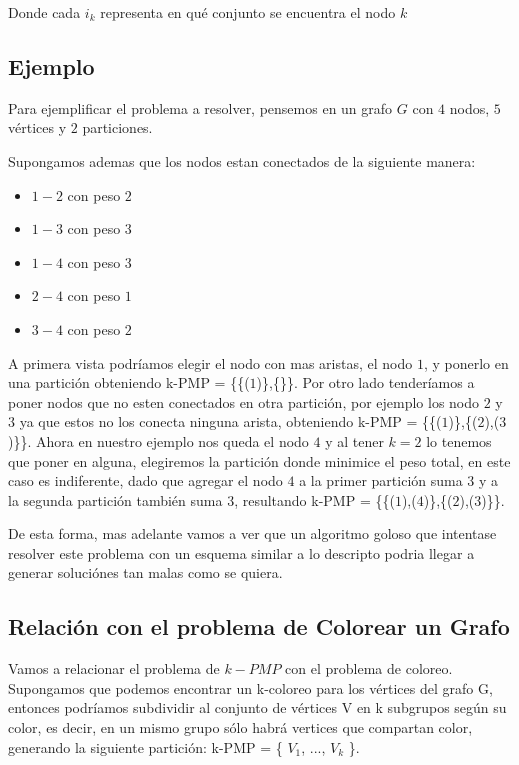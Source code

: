 Donde cada $i_k$ representa en qué conjunto se encuentra el nodo $k$

\subsection{Ejemplo}

Para ejemplificar el problema a resolver, pensemos en un grafo $G$ con $4$ nodos, $5$ vértices y $2$ particiones.

Supongamos ademas que los nodos estan conectados de la siguiente manera:

\begin{itemize}

	\item $1-2$ con peso $2$
	\item $1-3$ con peso $3$
	\item $1-4$ con peso $3$
	\item $2-4$ con peso $1$
	\item $3-4$ con peso $2$

\end{itemize}

A primera vista podríamos elegir el nodo con mas aristas, el nodo $1$, y ponerlo en una partición obteniendo k-PMP = \{\{($1$)\},\{\}\}. Por otro lado tenderíamos a poner nodos que no esten conectados en otra partición, por ejemplo los nodo $2$ y $3$ ya que estos no los conecta ninguna arista, obteniendo k-PMP = \{\{($1$)\},\{($2$),($3$)\}\}. Ahora en nuestro ejemplo nos queda el nodo $4$ y al tener $k = 2$ lo tenemos que poner en alguna, elegiremos la partición donde minimice el peso total, en este caso es indiferente, dado que agregar el nodo $4$ a la primer partición suma $3$ y a la segunda partición también suma $3$, resultando k-PMP = \{\{($1$),($4$)\},\{($2$),($3$)\}\}. 

De esta forma, mas adelante vamos a ver que un algoritmo goloso que intentase resolver este problema con un esquema similar a lo descripto podria llegar a generar soluciónes tan malas como se quiera.

\subsection{Relación con el problema de Colorear un Grafo}

Vamos a relacionar el problema de $k-PMP$ con el problema de coloreo. Supongamos que podemos encontrar un k-coloreo para los vértices del grafo G, entonces podríamos subdividir al conjunto de vértices V en k subgrupos según su color, es decir, en un mismo grupo sólo habrá vertices que compartan color, generando la siguiente partición: k-PMP = \{ $V_1$, ..., $V_k$ \}. 

